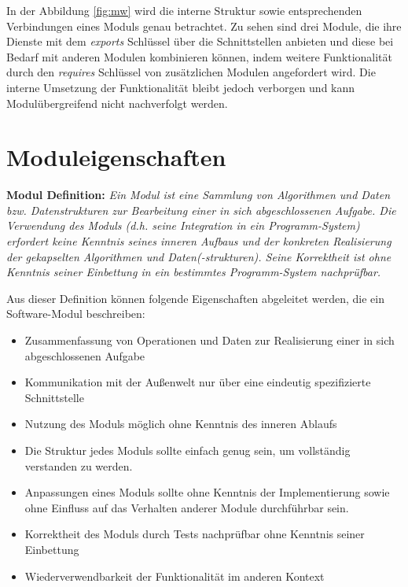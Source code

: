     In der Abbildung \ref{fig:mw} wird die interne Struktur sowie entsprechenden Verbindungen eines Moduls genau betrachtet. Zu sehen sind drei Module, die ihre Dienste mit dem \textit{exports} Schlüssel über die Schnittstellen anbieten und diese bei Bedarf mit anderen Modulen kombinieren können, indem weitere Funktionalität durch den \textit{requires} Schlüssel von zusätzlichen Modulen angefordert wird. Die interne Umsetzung der Funktionalität bleibt jedoch verborgen und kann Modulübergreifend nicht nachverfolgt werden. 

  \section{Moduleigenschaften} \label{sec:ME}

    \textbf{Modul Definition: } \textit {Ein Modul ist eine Sammlung von Algorithmen und Daten bzw. Datenstrukturen zur Bearbeitung einer in sich abgeschlossenen Aufgabe. Die Verwendung des Moduls (d.h. seine Integration in ein Programm-System) erfordert keine Kenntnis seines inneren Aufbaus und der konkreten Realisierung der gekapselten Algorithmen und Daten(-strukturen). Seine Korrektheit ist ohne Kenntnis seiner Einbettung in ein bestimmtes Programm-System nachprüfbar.} \cite{rechenberg2006informatik}\bigbreak 

    Aus dieser Definition können folgende Eigenschaften abgeleitet werden, die ein Software-Modul beschreiben:

    \begin{itemize}
      \item Zusammenfassung von Operationen und Daten zur Realisierung einer in sich abgeschlossenen Aufgabe 
      \item Kommunikation mit der Außenwelt nur über eine eindeutig spezifizierte Schnittstelle 
      \item Nutzung des Moduls möglich ohne Kenntnis des inneren Ablaufs 
      \item Die Struktur jedes Moduls sollte einfach genug sein, um vollständig verstanden zu werden.
      \item Anpassungen eines Moduls sollte ohne Kenntnis der Implementierung sowie ohne Einfluss auf das Verhalten anderer Module durchführbar sein.
      \item Korrektheit des Moduls durch Tests nachprüfbar ohne Kenntnis seiner Einbettung
      \item Wiederverwendbarkeit der Funktionalität im anderen Kontext
    \end{itemize}

